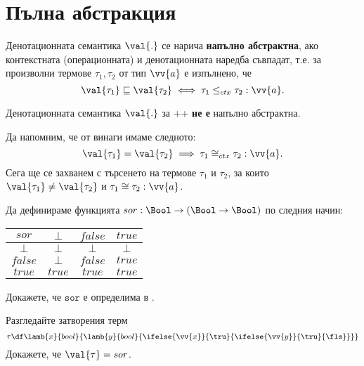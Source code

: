 \section{Пълна абстракция}\label{pcf:sect:full-abstraction}
\begin{definition}
  Денотационната семантика $\val{.}$ се нарича {\bf напълно абстрактна}, ако
  контекстната (операционната) и денотационната наредба съвпадат, т.е.
  за произволни термове $\tau_1,\tau_2$ от тип $\vv{a}$ е изпълнено, че
  \[\val{\tau_1} \sqsubseteq \val{\tau_2} \iff \tau_1 \leq_{ctx} \tau_2 : \vv{a}.\]
\end{definition}

\begin{framed}
  \begin{theorem}
    Денотационната семантика $\val{.}$ за \PCF++ {\bf не е} напълно абстрактна.
  \end{theorem}
\end{framed}
Да напомним, че от  винаги имаме следното:
\[ \val{\tau_1} = \val{\tau_2} \implies \tau_1 \cong_{ctx} \tau_2 : \vv{a}.\]
Сега ще се захванем с търсенето на термове $\tau_1$ и $\tau_2$, за които
$\val{\tau_1} \neq \val{\tau_2}$ и $\tau_1 \cong \tau_2 : \vv{a}$.

\begin{problem}
  Да дефинираме функцията $sor:\Bool \to (\Bool \to \Bool)$ по следния начин:

  \vspace{10pt}
  
  \begin{tabular}{|c|c|c|c|}
    \hline
    $sor$ & $\bot$ & $false$ & $true$ \\
    \hline
    $\bot$ & $\bot$ & $\bot$ & $\bot$\\
    \hline
    $false$ & $\bot$ & $false$ & $true$\\
    \hline
    $true$ & $true$ & $true$ & $true$\\
    \hline
  \end{tabular}

  \vspace{10pt}
  
  Докажете, че $\texttt{sor}$ е определима в \PCFPP.
\end{problem}
\begin{hint}
  Разгледайте затворения терм
  \[\tau \df \lamb{x}{bool}{\lamb{y}{bool}{\ifelse{\vv{x}}{\tru}{{\ifelse{\vv{y}}{\tru}{\fls}}}}}\]
  Докажете, че $\val{\tau} = sor$.
\end{hint}



